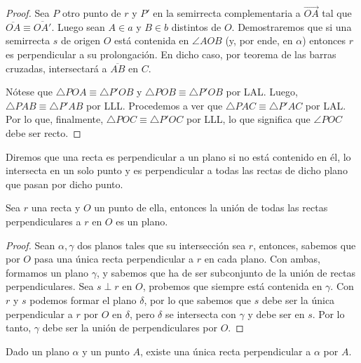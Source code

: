 \documentclass[11pt,a4paper]{book}
\begin{document}
\begin{proof}
Sea $P$ otro punto de $r$ y $P'$ en la semirrecta complementaria a $\overrightarrow{OA}$ tal que $\overline{OA}\equiv\overline{OA'}$. Luego sean $A\in a$ y $B\in b$ distintos de $O$. Demostraremos que si una semirrecta $s$  de origen $O$ está contenida en $\angle AOB$ (y, por ende, en $\alpha$) entonces $r$ es perpendicular a su prolongación. En dicho caso, por teorema de las barras cruzadas, intersectará a $\overline{AB}$ en $C$.

Nótese que $\triangle POA\equiv\triangle P'OB$ y $\triangle POB\equiv\triangle P'OB$ por LAL. Luego, $\triangle PAB\equiv\triangle P'AB$ por LLL. Procedemos a ver que $\triangle PAC\equiv\triangle P'AC$ por LAL. Por lo que, finalmente, $\triangle POC\equiv\triangle P'OC$ por LLL, lo que significa que $\angle POC$ debe ser recto.
\end{proof}
\begin{mydef}
Diremos que una recta es perpendicular a un plano si no está contenido en él, lo intersecta en un solo punto y es perpendicular a todas las rectas de dicho plano que pasan por dicho punto.
\end{mydef}
\begin{prop}
Sea $r$ una recta y $O$ un punto de ella, entonces la unión de todas las rectas perpendiculares a $r$ en $O$ es un plano.
\end{prop}
\begin{proof}
Sean $\alpha,\gamma$ dos planos tales que su intersección sea $r$, entonces, sabemos que por $O$ pasa una única recta perpendicular a $r$ en cada plano. Con ambas, formamos un plano $\gamma$, y sabemos que ha de ser subconjunto de la unión de rectas perpendiculares. Sea $s\perp r$ en $O$, probemos que siempre está contenida en $\gamma$. Con $r$ y $s$ podemos formar el plano $\delta$, por lo que sabemos que $s$ debe ser la única perpendicular a $r$ por $O$ en $\delta$, pero $\delta$ se intersecta con $\gamma$ y debe ser en $s$. Por lo tanto, $\gamma$ debe ser la unión de perpendiculares por $O$.
\end{proof}
\begin{thm}
Dado un plano $\alpha$ y un punto $A$, existe una única recta perpendicular a $\alpha$ por $A$.
\end{thm}
\end{document}
